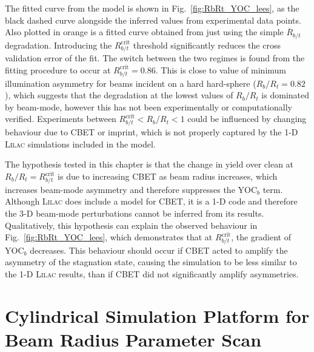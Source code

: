 The fitted curve from the model is shown in Fig.~\ref{fig:RbRt_YOC_lees}, as the black dashed curve alongside the inferred values from experimental data points.
Also plotted in orange is a fitted curve obtained from just using the simple $\overline{R}_{b/t}$ degradation.
Introducing the $R_{b/t}^{\text{crit}}$ threshold significantly reduces the cross validation error of the fit.
The switch between the two regimes is found from the fitting procedure to occur at $R_{b/t}^{\text{crit}}=0.86$.
This is close to value of minimum illumination asymmetry for beams incident on a hard hard-sphere ($R_b/R_t=0.82$), which suggests that the degradation at the lowest values of $R_b/R_t$ is dominated by beam-mode, however this has not been experimentally or computationally verified.
Experiments between $R_{b/t}^{\text{crit}} < R_b/R_t < 1$ could be influenced by changing behaviour due to \ac{CBET} or imprint, which is not properly captured by the 1-D \textsc{Lilac} simulations included in the model.

The hypothesis tested in this chapter is that the change in yield over clean at $R_b/R_t = R_{b/t}^{\text{crit}}$ is due to increasing \ac{CBET} as beam radius increases, which increases beam-mode asymmetry and therefore suppresses the $\text{YOC}_{b}$ term.
Although \textsc{Lilac} does include a model for \ac{CBET}, it is a 1-D code and therefore the 3-D beam-mode perturbations cannot be inferred from its results.
Qualitatively, this hypothesis can explain the observed behaviour in Fig.~\ref{fig:RbRt_YOC_lees}, which demonstrates that at $R_{b/t}^{\text{crit}}$, the gradient of $\text{YOC}_{b}$ decreases.
This behaviour should occur if \ac{CBET} acted to amplify the asymmetry of the stagnation state, causing the simulation to be less similar to the 1-D \textsc{Lilac} results, than if \ac{CBET} did not significantly amplify asymmetries.

\section{Cylindrical Simulation Platform for Beam Radius Parameter Scan}%
\label{sec:Res1_CylRbRt_platform}

